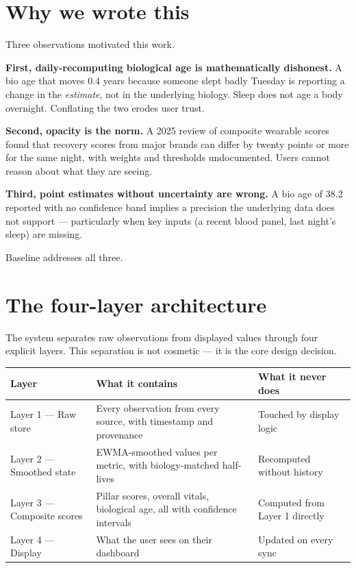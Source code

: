 \documentclass[11pt, a4paper]{article}
\begin{document}
\section{Why we wrote this}

Three observations motivated this work.

\textbf{First, daily-recomputing biological age is mathematically dishonest.} A bio age that moves 0.4 years because someone slept badly Tuesday is reporting a change in the \emph{estimate}, not in the underlying biology. Sleep does not age a body overnight. Conflating the two erodes user trust.

\textbf{Second, opacity is the norm.} A 2025 review of composite wearable scores found that recovery scores from major brands can differ by twenty points or more for the same night, with weights and thresholds undocumented. Users cannot reason about what they are seeing.

\textbf{Third, point estimates without uncertainty are wrong.} A bio age of 38.2 reported with no confidence band implies a precision the underlying data does not support --- particularly when key inputs (a recent blood panel, last night's sleep) are missing.

Baseline addresses all three.

\section{The four-layer architecture}

The system separates raw observations from displayed values through four explicit layers. This separation is not cosmetic --- it is the core design decision.

\vspace{0.5em}
\noindent
\begin{tabularx}{\linewidth}{@{} L{3.2cm} X L{3.8cm} @{}}
\toprule
\textbf{Layer} & \textbf{What it contains} & \textbf{What it never does} \\
\midrule
Layer 1 --- Raw store & Every observation from every source, with timestamp and provenance & Touched by display logic \\
Layer 2 --- Smoothed state & EWMA-smoothed values per metric, with biology-matched half-lives & Recomputed without history \\
Layer 3 --- Composite scores & Pillar scores, overall vitals, biological age, all with confidence intervals & Computed from Layer 1 directly \\
Layer 4 --- Display & What the user sees on their dashboard & Updated on every sync \\
\bottomrule
\end{tabularx}
\vspace{0.5em}
\end{document}
